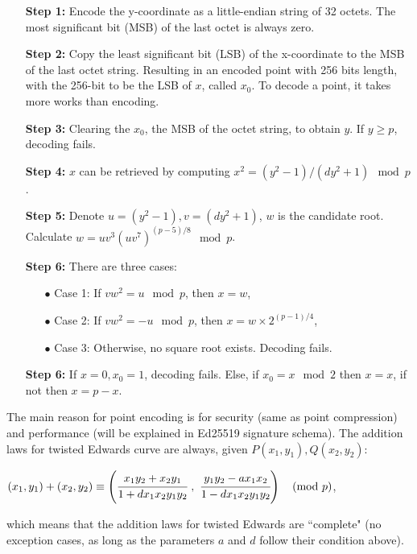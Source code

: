 \begin{itemize}[leftmargin=2.2cm]
  \item[\textbf{Step 1:}] Encode the y-coordinate as a little-endian string of 32 octets. The most significant bit (MSB) of the last octet is always zero.
  \item[\textbf{Step 2:}] Copy the least significant bit (LSB) of the x-coordinate to the MSB of the last octet string. Resulting in an encoded point with 256 bits length, with the 256-bit to be the LSB of $x$, called $x_0$. To decode a point, it takes more works than encoding.
  \item[\textbf{Step 3:}] Clearing the $x_0$, the MSB of the octet string, to obtain $y$. If $y \geq p$, decoding fails.
  \item[\textbf{Step 4:}] $x$ can be retrieved by computing $x^2 = (y^2 - 1)/(dy^2 + 1) \mod p$.
  \item[\textbf{Step 5:}] Denote $u = (y^2-1), v = (dy^2 + 1)$, $w$ is the candidate root. Calculate $w = uv^3(uv^7)^{(p-5)/8} \mod p$.
  \item[\textbf{Step 6:}] There are three cases:

        \begin{itemize}[leftmargin=0.5mm]
          \item[$\bullet$] Case 1: If $vw^2 = u \mod p$, then $x = w$,
          \item[$\bullet$] Case 2: If $vw^2 = -u \mod p$, then $x = w \times 2^{(p-1)/4}$,
          \item[$\bullet$] Case 3: Otherwise, no square root exists. Decoding fails.
        \end{itemize}

  \item[\textbf{Step 6:}] If $x = 0,x_0 = 1$, decoding fails. Else, if $x_0 = x \mod 2$ then $x = x$, if not then $x = p - x$.
\end{itemize}

The main reason for point encoding is for security (same as point compression) and performance (will be explained in Ed25519 signature schema). The addition laws for twisted Edwards curve are always, given $P(x_1, y_1), Q(x_2, y_2)$:

\begin{center}
  $(x_1, y_1) + (x_2, y_2) \equiv \left(\cfrac{x_1y_2 + x_2y_1}{1 + dx_1x_2y_1y_2} \ , \ \cfrac{y_1y_2 - ax_1x_2}{1 - dx_1x_2y_1y_2}\right) \quad (\text{mod} \ p)$,
\end{center}

which means that the addition laws for twisted Edwards are ``complete" (no exception cases, as long as the parameters $a$ and $d$ follow their condition above).

